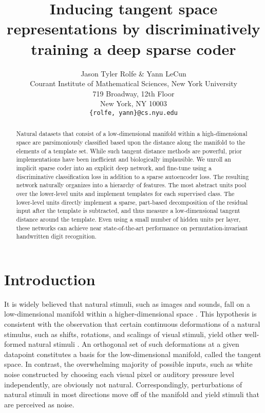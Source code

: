 \documentclass{article} %
\title{Inducing tangent space representations by discriminatively training a deep sparse coder}
\author{
Jason Tyler Rolfe \& Yann LeCun \\ %
Courant Institute of Mathematical Sciences, New York University\\ 
719 Broadway, 12th Floor \\
New York, NY 10003\\
\texttt{\{rolfe, yann\}@cs.nyu.edu} \\
}
\begin{document}
\maketitle

\begin{abstract}
Natural datasets that consist of a low-dimensional manifold within a high-dimensional space are parsimoniously classified based upon the distance along the manifold to the elements of a template set.  While such tangent distance methods are powerful, prior implementations have been inefficient and biologically implausible.  We unroll an implicit sparse coder into an explicit deep network, and fine-tune using a discriminative classification loss in addition to a sparse autoencoder loss.  The resulting network naturally organizes into a hierarchy of features.  The most abstract units pool over the lower-level units and implement templates for each supervised class.  The lower-level units directly implement a sparse, part-based decomposition of the residual input after the template is subtracted, and thus measure a low-dimensional tangent distance around the template.  Even using a small number of hidden units per layer, these networks can achieve near state-of-the-art performance on permutation-invariant handwritten digit recognition.
\end{abstract}

\section{Introduction}

It is widely believed that natural stimuli, such as images and sounds, fall on a low-dimensional manifold within a higher-dimensional space \cite{lee2003, olshausen2004, bengio2012}.  This hypothesis is consistent with the observation that certain continuous deformations of a natural stimulus, such as shifts, rotations, and scalings of visual stimuli, yield other well-formed natural stimuli \cite{simard1998}.  An orthogonal set of such deformations at a given datapoint constitutes a basis for the low-dimensional manifold, called the tangent space.  In contrast, the overwhelming majority of possible inputs, such as white noise constructed by choosing each visual pixel or auditory pressure level independently, are obviously not natural.  Correspondingly, perturbations of natural stimuli in most directions move off of the manifold and yield stimuli that are perceived as noise.  
\end{document}
